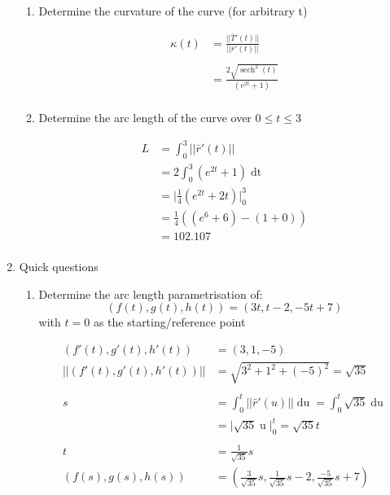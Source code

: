\documentclass[a4paper,11pt]{article}
\begin{document}
\begin{enumerate}
\begin{enumerate}
        \item  Determine the curvature of the curve (for arbitrary t)
        
        \begin{align*}
            \kappa(t) &= \frac{|| \bar{T}'(t) ||}{|| \bar{r}'(t) ||}\\\\
            &= \frac{2 \sqrt{\operatorname{sech}^2(t)}}{(e^{2t}+1)} \\
        \end{align*}

        \newpage

        \item  Determine the arc length of the curve over $ 0 \leq t \leq 3 $
        
        \begin{align*}
            L &= \int_{0}^{3} || \bar{r}'(t) ||\\
              &= 2 \int_{0}^{3} (e^{2t}+1) \operatorname{dt}\\
              &= \Big| \frac{1}{4}(e^{2t} + 2t) \Big|^3_0\\
              &= \frac{1}{4}((e^6 + 6) - (1+0))\\
              &= 102.107\\
        \end{align*}

    \end{enumerate}

    \item  Quick questions\\
    
    \begin{enumerate}
        \item Determine the arc length parametrisation of:
        $$ (f(t),g(t),h(t)) = (3t,t-2,-5t+7) $$
        with $t = 0$ as the starting/reference point

        \begin{align*}
            \left(f'(t), g'(t), h'(t)\right) &= \left( 3, 1, -5 \right)\\
            ||\left(f'(t), g'(t), h'(t)\right)|| &= \sqrt{3^2 + 1^2 + (-5)^2}=\sqrt{35}\\\\
            s &= \int^t_0 || \bar{r}'(u) || \operatorname{du} = \int^t_0 \sqrt{35} \operatorname{du}\\
            &= \Big| \sqrt{35}\operatorname{u} \Big|^t_0 = \sqrt{35}t\\\\
            t &= \frac{1}{\sqrt{35}}s\\
            (f(s),g(s),h(s)) &= \left( \frac{3}{\sqrt{35}}s, \frac{1}{\sqrt{35}}s -2, \frac{-5}{\sqrt{35}}s +7 \right)\\
        \end{align*}


\end{enumerate}
\end{enumerate}
\end{document}
